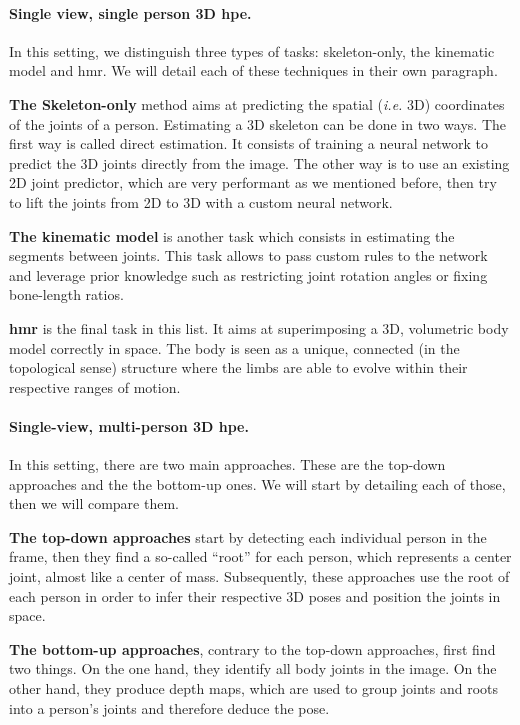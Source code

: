 \documentclass[runningheads]{llncs}
\begin{document}
\paragraph{Single view, single person 3D \ac{hpe}.}
In this setting, we distinguish three types of tasks:  skeleton-only, the kinematic model and \ac{hmr}. We will detail each of these techniques in their own paragraph.

\textbf{The Skeleton-only} method aims at predicting the spatial (\textit{i.e.} 3D) coordinates of the joints of a person. Estimating a 3D skeleton can be done in two ways. The first way is called direct estimation. It consists of training a neural network to predict the 3D joints directly from the image. The other way is to use an existing 2D joint predictor, which are very performant as we mentioned before, then try to lift the joints from 2D to 3D with a custom neural network.

\textbf{The kinematic model} is another task which consists in estimating the segments between joints. This task allows to pass custom rules to the network and leverage prior knowledge such as restricting joint rotation angles or fixing bone-length ratios.

\textbf{\ac{hmr}} is the final task in this list. It aims at superimposing a 3D, volumetric body model correctly in space. The body is seen as a unique, connected (in the topological sense) structure where the limbs are able to evolve within their respective ranges of motion.
\paragraph{Single-view, multi-person 3D \ac{hpe}.}
In this setting, there are two main approaches. These are the top-down approaches and the the bottom-up ones. We will start by detailing each of those, then we will compare them.

\textbf{The top-down approaches} start by detecting each individual person in the frame, then they find a so-called ``root'' for each person, which represents a center joint, almost like a center of mass. Subsequently, these approaches use the root of each person in order to infer their respective 3D poses and position the joints in space.

\textbf{The bottom-up approaches}, contrary to the top-down approaches, first find two things. On the one hand, they identify all body joints in the image. On the other hand, they produce depth maps, which are used to group joints and roots into a person's joints and therefore deduce the pose.
\end{document}
